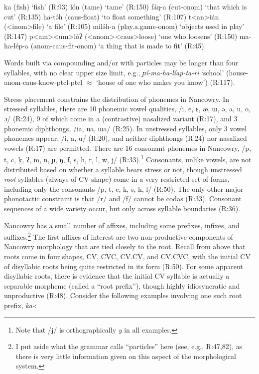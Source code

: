 \documentclass[output=paper]{langscibook}
\begin{document}
\ea \label{kalinone}
\ea ka (fish) \hfill `fish' (R:93)
\ex l\'on (tame) \hfill `tame' (R:150)
\ex f\'aŋ-a (cut-{\sc onom}) \hfill `that which is cut' (R:135)
\ex ha-t\'əh ({\sc caus}-float) \hfill `to float something' (R:107)
\ex t<an>i\'an ({\sc <inom>}file) \hfill `a file'  (R:105)
\ex mil\'əh-a (play.a.game-{\sc onom}) \hfill `objects used in play' (R:147)
\ex p<am><um>l\'oʔ ({\sc <anom><caus>}loose) \hfill `one who loosens' (R:150)
\ex ma-ha-l\'ep-a ({\sc anom-caus}-fit-{\sc onom}) \hfill `a thing that is made to fit'  (R:45)
\z
\z

\noindent Words built via compounding and/or with particles may be longer than four syllables, with no clear upper size limit, e.g., {\it ɲ\'i-ma-ha-l\'iap-ta-ri} `school' (house-{\sc anom-caus-}know-{\sc ptcl-ptcl}  $\approx$ `house of one who makes you know') (R:117).

Stress placement constrains the distribution of phonemes in Nancowry. In stressed syllables, there are 10 phonemic vowel qualities, /i, e, ɛ, \ae, ɯ, ə, a, u, o, ɔ/ (R:24), 9 of which come in a (contrastive) nasalized variant (R:17), and 3 phonemic diphthongs, /ia, ua, ɯa/ (R:25). In unstressed syllables, only 3 vowel phonemes appear, /i, a, u/ (R:20), and neither diphthongs (R:24) nor nasalized vowels (R:17) are permitted. There are 16 consonant phonemes in Nancowry, /p, t, c, k, ʔ, m, n, ɲ, ŋ, f, s, h, r, l, w, j/ (R:33).\footnote{Note that /j/ is orthographically \textit{y} in all examples.} Consonants, unlike vowels, are not distributed based on whether a syllable bears stress or not, though unstressed {\it root} syllables (always of CV shape) come in a very restricted set of forms, including only the consonants /p, t, c, k, s, h, l/ (R:50). The only other major phonotactic constraint is that /r/ and /f/ cannot be codas (R:33). Consonant sequences of a wide variety occur, but only across syllable boundaries (R:36).

Nancowry has a small number of affixes, including some prefixes, infixes, and suffixes.\footnote{I put aside what the grammar calls ``particles'' here (see, e.g., R:47,82), as there is very little information given on this aspect of the morphological system.} The first affixes of interest are two non-productive components of Nancowry morphology that are tied closely to the root. Recall from above that roots come in four shapes, CV, CVC, CV.CV, and CV.CVC, with the initial CV of disyllabic roots being quite restricted in its form (R:50). For some apparent disyllabic roots, there is evidence that the initial CV syllable is actually a separable morpheme (called a ``root prefix''), though highly idiosyncratic and unproductive (R:48). Consider the following examples involving one such root prefix, \textit{ka-}:
\end{document}
